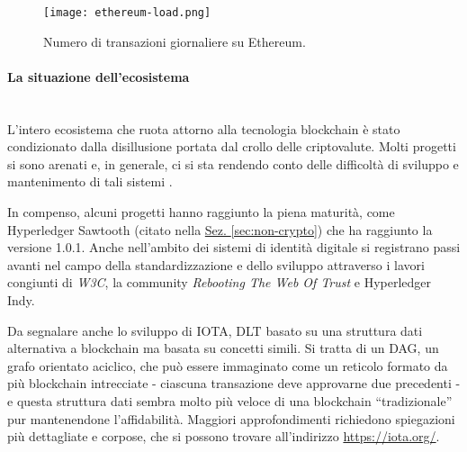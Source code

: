     \begin{figure}[ht]
        \centering
        \texttt{[image: ethereum-load.png]}
        \caption[Numero di transazioni giornaliere su Ethereum]{Numero di transazioni giornaliere su Ethereum.}
        \label{fig:ethereum-load}
    \end{figure}

\paragraph{La situazione dell'ecosistema} ~ \\
    L'intero ecosistema che ruota attorno alla tecnologia blockchain è stato condizionato dalla disillusione portata dal crollo delle criptovalute. Molti progetti si sono arenati e, in generale, ci si sta rendendo conto delle difficoltà di sviluppo e mantenimento di tali sistemi \cite{blockchain_delusion}.

    In compenso, alcuni progetti hanno raggiunto la piena maturità, come Hyperledger Sawtooth (citato nella \hyperref[sec:non-crypto]{Sez. \ref*{sec:non-crypto}}) che ha raggiunto la versione 1.0.1. Anche nell'ambito dei sistemi di identità digitale si registrano passi avanti nel campo della standardizzazione e dello sviluppo attraverso i lavori congiunti di \emph{W3C}, la community \emph{Rebooting The Web Of Trust} \cite{rebooting_web_of_trust} e Hyperledger Indy.

    Da segnalare anche lo sviluppo di IOTA, DLT basato su una struttura dati alternativa a blockchain ma basata su concetti simili. Si tratta di un DAG, un grafo orientato aciclico, che può essere immaginato come un reticolo formato da più blockchain intrecciate - ciascuna transazione deve approvarne due precedenti - e questa struttura dati sembra molto più veloce di una blockchain ``tradizionale'' pur mantenendone l'affidabilità. Maggiori approfondimenti richiedono spiegazioni più dettagliate e corpose, che si possono trovare all'indirizzo \url{https://iota.org/}.